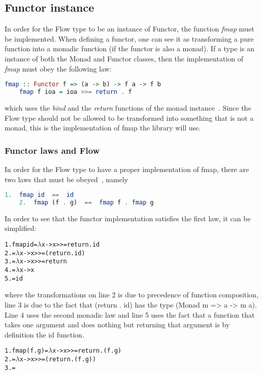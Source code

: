 \subsection{Functor instance}
In order for the Flow type to be an instance of Functor, the function \emph{fmap} must be implemented. When defining a functor, one can see it as transforming a pure function into a monadic function (if the functor is also a monad). If a type is an instance of both the Monad and Functor classes, then the implementation of \emph{fmap} must obey the following law:
\begin{center}
  \begin{lstlisting}[language=Haskell]
    fmap :: Functor f => (a -> b) -> f a -> f b
    fmap f ioa = ioa >>= return . f
  \end{lstlisting}
\end{center}
which uses the \emph{bind} and the \emph{return} functions of the monad instance~\cite{functor-monad-law}. Since the Flow type should not be allowed to be transformed into something that is not a monad, this is the implementation of fmap the library will use.
\subsubsection{Functor laws and Flow}
In order for the Flow type to have a proper implementation of fmap, there are two laws that must be obeyed~\cite{functor-laws}, namely
\begin{center}
  \begin{lstlisting}[language=Haskell]
    1.  fmap id  ==  id
    2.  fmap (f . g)  ==  fmap f . fmap g
  \end{lstlisting}
\end{center}
In order to see that the functor implementation satisfies the first law, it can be simplified:
\begin{alltt}
  1. fmap id = \(\lambda\)x -> x >>= return . id
  2.         = \(\lambda\)x -> x >>= (return . id)
  3.         = \(\lambda\)x -> x >>= return
  4.         = \(\lambda\)x -> x
  5.         = id
\end{alltt}
where the transformations on line 2 is due to precedence of function composition, line 3 is due to the fact that (return . id) has the type (Monad m => a -> m a). Line 4 uses the second monadic law and line 5 uses the fact that a function that takes one argument and does nothing but returning that argument is by definition the id function.

\begin{alltt}
  1. fmap (f . g) = \(\lambda\)x -> x >>= return . (f . g)
  2.              = \(\lambda\)x -> x >>= (return . (f . g))
  3.              = 
\end{alltt}
